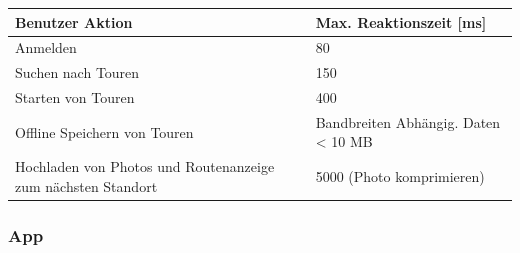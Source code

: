 \documentclass[a4paper,10pt,xetex]{article}
\begin{document}
\begin{longtable}[]{@{}ll@{}}
\toprule
\begin{minipage}[b]{0.27\columnwidth}\raggedright\strut
Benutzer Aktion\strut
\end{minipage} & \begin{minipage}[b]{0.29\columnwidth}\raggedright\strut
Max. Reaktionszeit {[}ms{]}\strut
\end{minipage}\tabularnewline
\midrule
\endhead
\begin{minipage}[t]{0.27\columnwidth}\raggedright\strut
Anmelden\strut
\end{minipage} & \begin{minipage}[t]{0.29\columnwidth}\raggedright\strut
80\strut
\end{minipage}\tabularnewline
\begin{minipage}[t]{0.27\columnwidth}\raggedright\strut
Suchen nach Touren\strut
\end{minipage} & \begin{minipage}[t]{0.29\columnwidth}\raggedright\strut
150\strut
\end{minipage}\tabularnewline
\begin{minipage}[t]{0.27\columnwidth}\raggedright\strut
Starten von Touren\strut
\end{minipage} & \begin{minipage}[t]{0.29\columnwidth}\raggedright\strut
400\strut
\end{minipage}\tabularnewline
\begin{minipage}[t]{0.27\columnwidth}\raggedright\strut
Offline Speichern von Touren\strut
\end{minipage} & \begin{minipage}[t]{0.29\columnwidth}\raggedright\strut
Bandbreiten Abhängig. Daten \textless{} 10 MB\strut
\end{minipage}\tabularnewline
\begin{minipage}[t]{0.27\columnwidth}\raggedright\strut
Hochladen von Photos und Routenanzeige zum nächsten Standort\strut
\end{minipage} & \begin{minipage}[t]{0.29\columnwidth}\raggedright\strut
5000 (Photo komprimieren)\strut
\end{minipage}\tabularnewline
\bottomrule
\end{longtable}

\subsubsection{App}\label{app}
\end{document}
